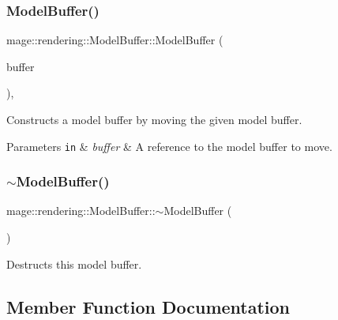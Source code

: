 \subsubsection{\texorpdfstring{Model\+Buffer()}{ModelBuffer()}\hspace{0.1cm}{\footnotesize\ttfamily [3/3]}}
{\footnotesize\ttfamily mage\+::rendering\+::\+Model\+Buffer\+::\+Model\+Buffer (\begin{DoxyParamCaption}\item[{\mbox{\hyperlink{structmage_1_1rendering_1_1_model_buffer}{Model\+Buffer}} \&\&}]{buffer }\end{DoxyParamCaption})\hspace{0.3cm}{\ttfamily [default]}, {\ttfamily [noexcept]}}

Constructs a model buffer by moving the given model buffer.


\begin{DoxyParams}[1]{Parameters}
\mbox{\tt in}  & {\em buffer} & A reference to the model buffer to move. \\
\hline
\end{DoxyParams}
\mbox{\label{structmage_1_1rendering_1_1_model_buffer_a8234e3377ffe079b8ac045198d8cdbc1}} 
\subsubsection{\texorpdfstring{$\sim$\+Model\+Buffer()}{~ModelBuffer()}}
{\footnotesize\ttfamily mage\+::rendering\+::\+Model\+Buffer\+::$\sim$\+Model\+Buffer (\begin{DoxyParamCaption}{ }\end{DoxyParamCaption})\hspace{0.3cm}{\ttfamily [default]}}

Destructs this model buffer. 

\subsection{Member Function Documentation}
\mbox{\label{structmage_1_1rendering_1_1_model_buffer_a7435706a5297e1dfac59ac3c24a8e168}} 
